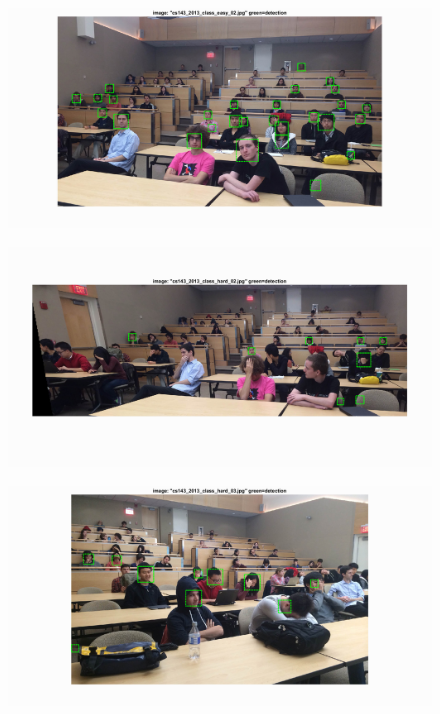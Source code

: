 \documentclass{article}
\begin{document}
\begin{figure}[!htb]
 \centering
  \includegraphics[width=.99\textwidth]{extra_easy3.png}
\end{figure}%
\begin{figure}[!htb]
  \centering
  \includegraphics[width=.99\textwidth]{extra_hard3.png}
\end{figure}%
\newpage
\begin{figure}[!htb]
  \centering
  \includegraphics[width=.99\textwidth]{extra_hard4.png}
\end{figure}%
\end{document}

